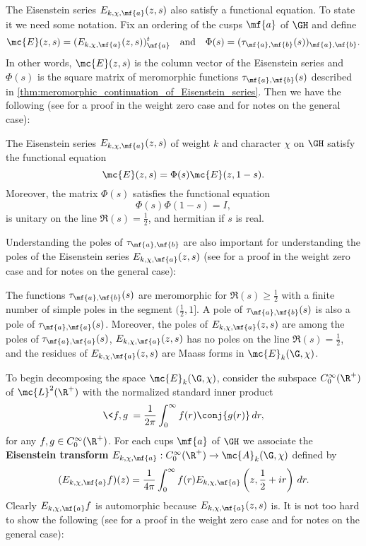     The Eisenstein series $E_{k,\chi,\mf{a}}(z,s)$ also satisfy a functional equation. To state it we need some notation. Fix an ordering of the cusps $\mf{a}$ of $\GH$ and define
    \[
      \mc{E}(z,s) = (E_{k,\chi,\mf{a}}(z,s))_{\mf{a}}^{t} \quad \text{and} \quad \Phi(s) = (\tau_{\mf{a},\mf{b}}(s))_{\mf{a},\mf{b}}.
    \]
    In other words, $\mc{E}(z,s)$ is the column vector of the Eisenstein series and $\Phi(s)$ is the square matrix of meromorphic functions $\tau_{\mf{a},\mf{b}}(s)$ described in \cref{thm:meromorphic_continuation_of_Eisenstein_series}. Then we have the following (see \cite{iwaniec2002spectral} for a proof in the weight zero case and \cite{cohenmodular2017} for notes on the general case): 

    \begin{theorem}\label{thm:functional_equation_of_Eisenstein_series}
      The Eisenstein series $E_{k,\chi,\mf{a}}(z,s)$ of weight $k$ and character $\chi$ on $\GH$ satisfy the functional equation 
      \[
        \mc{E}(z,s) = \Phi(s)\mc{E}(z,1-s).
      \]
      Moreover, the matrix $\Phi(s)$ satisfies the functional equation
      \[
        \Phi(s)\Phi(1-s) = I,
      \]
      is unitary on the line $\Re(s) = \frac{1}{2}$, and hermitian if $s$ is real.
    \end{theorem}

    Understanding the poles of $\tau_{\mf{a},\mf{b}}$ are also important for understanding the poles of the Eisenstein series $E_{k,\chi,\mf{a}}(z,s)$ (see \cite{iwaniec2002spectral} for a proof in the weight zero case and \cite{cohenmodular2017} for notes on the general case):

    \begin{theorem}\label{thm:residues_of_Eisenstein_series}
      The functions $\tau_{\mf{a},\mf{b}}(s)$ are meromorphic for $\Re(s) \ge \frac{1}{2}$ with a finite number of simple poles in the segment $(\frac{1}{2},1]$. A pole of $\tau_{\mf{a},\mf{b}}(s)$ is also a pole of $\tau_{\mf{a},\mf{a}}(s)$. Moreover, the poles of $E_{k,\chi,\mf{a}}(z,s)$ are among the poles of $\tau_{\mf{a},\mf{a}}(s)$, $E_{k,\chi,\mf{a}}(z,s)$ has no poles on the line $\Re(s) = \frac{1}{2}$, and the residues of $E_{k,\chi,\mf{a}}(z,s)$ are Maass forms in $\mc{E}_{k}(\G,\chi)$.
    \end{theorem}

    To begin decomposing the space $\mc{E}_{k}(\G,\chi)$, consider the subspace $C_{0}^{\infty}(\R^{+})$ of $\mc{L}^{2}(\R^{+})$ with the normalized standard inner product
    \[
      \<f,g\> = \frac{1}{2\pi}\int_{0}^{\infty}f(r)\conj{g(r)}\,dr,
    \]
    for any $f,g \in C_{0}^{\infty}(\R^{+})$. For each cups $\mf{a}$ of $\GH$ we associate the \textbf{Eisenstein transform} $E_{k,\chi,\mf{a}}:C_{0}^{\infty}(\R^{+}) \to \mc{A}_{k}(\G,\chi)$ defined by
    \[
      (E_{k,\chi,\mf{a}}f)(z) = \frac{1}{4\pi}\int_{0}^{\infty}f(r)E_{k,\chi,\mf{a}}\left(z,\frac{1}{2}+ir\right)\,dr.
    \]
    Clearly $E_{k,\chi,\mf{a}}f$ is automorphic because $E_{k,\chi,\mf{a}}(z,s)$ is. It is not too hard to show the following (see \cite{iwaniec2002spectral} for a proof in the weight zero case and \cite{cohenmodular2017} for notes on the general case):

